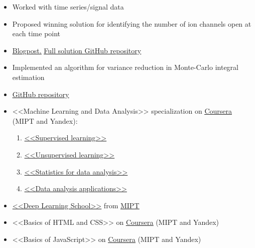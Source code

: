 

\begin{itemize}
	\item Worked with time series/signal data
	\item Proposed winning solution for identifying the number of ion channels open at each time point
	\item \href{https://www.kaggle.com/c/liverpool-ion-switching/discussion/153991}{\underline{Blogpost.}} \href{https://github.com/stdereka/liverpool-ion-switching}{\underline{Full solution GitHub repository}}
\end{itemize}

\divider

\begin{itemize}
	\item Implemented an algorithm for variance reduction in Monte-Carlo integral estimation
	\item \href{https://github.com/stdereka/MAP361P}{\underline{GitHub repository}}
\end{itemize}


\begin{itemize}
\item <<Machine Learning and Data Analysis>> specialization on \href{https://www.coursera.org/specializations/machine-learning-data-analysis?}{\underline{Coursera}} (MIPT and Yandex):
\begin{enumerate}
	\item \href{https://www.coursera.org/learn/supervised-learning?specialization=machine-learning-data-analysis}{<<Supervised learning>>}
	\item \href{https://www.coursera.org/learn/unsupervised-learning?specialization=machine-learning-data-analysis}{<<Unsupervised learning>>}
	\item \href{https://www.coursera.org/learn/stats-for-data-analysis/}{<<Statistics for data analysis>>}
	\item \href{https://www.coursera.org/learn/data-analysis-applications/}{<<Data analysis applications>>}
\end{enumerate}


\divider
\item \href{https://en.dlschool.org/}{<<Deep Learning School>>} from \href{https::/mipt.ru/en}{\underline{MIPT}}
\item <<Basics of HTML and CSS>> on \href{https://www.coursera.org/learn/snovy-html-i-css?specialization=razrabotka-interfeysov}{\underline{Coursera}} (MIPT and Yandex)
\item <<Basics of JavaScript>> on \href{https://www.coursera.org/learn/javascript-osnovy-i-funktsii}{\underline{Coursera}} (MIPT and Yandex)

\end{itemize}



